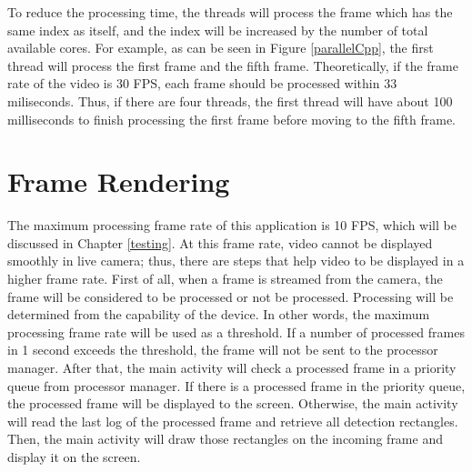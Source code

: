         To reduce the processing time,
        the threads will process the frame which has the same index as itself,
        and the index will be increased by the number of total available cores.
        For example, as can be seen in Figure \ref{parallelCpp},
        the first thread will process the first frame and the fifth frame.
        Theoretically, if the frame rate of the video is 30 FPS, each frame should be processed within 33 miliseconds.
        Thus, if there are four threads,
        the first thread will have about 100 milliseconds to finish processing the first frame before moving to the fifth frame.

    \section{Frame Rendering}
        The maximum processing frame rate of this application is 10 FPS, which will be discussed in Chapter \ref{testing}.
        At this frame rate, video cannot be displayed smoothly in live camera;
        thus, there are steps that help video to be displayed in a higher frame rate.
        First of all, when a frame is streamed from the camera,
        the frame will be considered to be processed or not be processed.
        Processing will be determined from the capability of the device.
        In other words, the maximum processing frame rate will be used as a threshold.
        If a number of processed frames in 1 second exceeds the threshold,
        the frame will not be sent to the processor manager.
        After that, the main activity will check a processed frame in a priority queue from processor manager.
        If there is a processed frame in the priority queue, the processed frame will be displayed to the screen.
        Otherwise, the main activity will read the last log of the processed frame and retrieve all detection rectangles.
        Then, the main activity will draw those rectangles on the incoming frame and display it on the screen.
